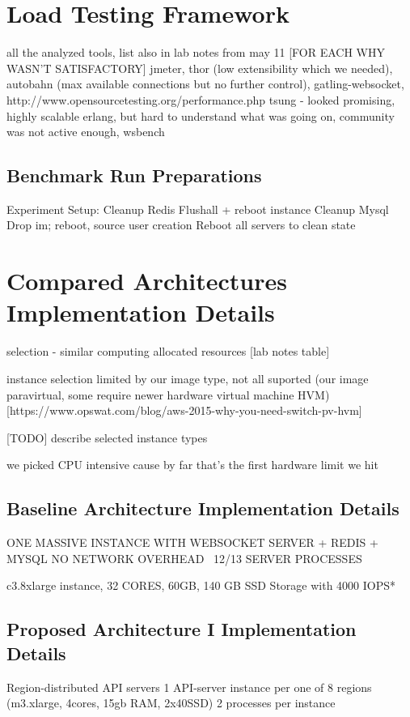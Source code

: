 \documentclass{uvamscse}
\begin{document}
\section{Load Testing Framework}\label{Load Testing Framework}
all the analyzed tools, list also in lab notes from may 11 [FOR EACH WHY WASN'T SATISFACTORY]
jmeter, thor (low extensibility which we needed), autobahn (max available connections but no further control),
gatling-websocket, http://www.opensourcetesting.org/performance.php
tsung - looked promising, highly scalable erlang, but hard to understand what was going on, community was not active enough, wsbench


\subsection{Benchmark Run Preparations}

Experiment Setup:
Cleanup Redis
Flushall + reboot instance
Cleanup Mysql
Drop im; reboot, source user creation
Reboot all servers to clean state


\section{Compared Architectures Implementation Details}\label{Compared Architectures Implementation Details}

selection - similar computing allocated resources [lab notes table]

instance selection limited by our image type, not all suported (our image paravirtual, some require newer hardware virtual machine HVM) [https://www.opswat.com/blog/aws-2015-why-you-need-switch-pv-hvm]

[TODO] describe selected instance types

we picked CPU intensive cause by far that's the first hardware limit we hit

\subsection{Baseline Architecture Implementation Details}\label{Baseline Architecture Implementation Details}
ONE MASSIVE INSTANCE WITH WEBSOCKET SERVER + REDIS + MYSQL
NO NETWORK OVERHEAD
~12/13 SERVER PROCESSES

c3.8xlarge instance, 32 CORES, 60GB, 140 GB SSD Storage with 4000 IOPS*

\subsection{Proposed Architecture I Implementation Details}\label{Proposed Architecture I Implementation Details}
Region-distributed API servers
1 API-server instance per one of 8 regions (m3.xlarge, 4cores, 15gb RAM, 2x40SSD)
2 processes per instance
\end{document}
